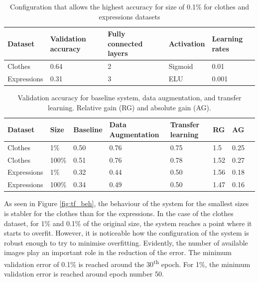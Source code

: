 \documentclass{article}
\begin{document}
\begin{table}[!htb]
  \vskip 5mm
  \centering
  \begin{tabular}{| l | l | l | l | l |}
    \hline
    \textbf{Dataset} & \textbf{Validation accuracy} & \textbf{Fully connected layers}& \textbf{Activation} & \textbf{Learning rates}\\ \hline
    Clothes & 0.64 & 2 & Sigmoid & 0.01 \\ \hline
    Expressions & 0.31  & 3 & ELU & 0.001 \\ \hline
  \end{tabular}
  \caption{Configuration that allows the highest accuracy for size of 0.1\% for clothes and expressions datasets}
  \label{tab:tf_1}
\end{table}

\begin{table}[!htb]
  \centering
  \begin{tabular}{| l | l | l | l | l | l | l | l |}
    \hline
    \textbf{Dataset} & \textbf{Size} & \textbf{Baseline} & \textbf{Data Augmentation}& \textbf{Transfer learning} & \textbf{RG} &\textbf{AG}\\ \hline
    Clothes & 1\% & 0.50 & 0.76 & 0.75 & 1.5 & 0.25\\ \hline
    Clothes & 100\% & 0.51 & 0.76 & 0.78 & 1.52 & 0.27\\ \hline
    Expressions & 1\% & 0.32  & 0.44 & 0.50 & 1.56 & 0.18\\ \hline
    Expressions & 100\% & 0.34  & 0.49 & 0.50 & 1.47 & 0.16\\ \hline
  \end{tabular}
  \caption{Validation accuracy for baseline system, data augmentation, and transfer learning. Relative gain (RG) and absolute gain (AG).}
  \label{tab:tf_2}
\end{table}

As seen in Figure \ref{fig:tf_beh}, the behaviour of the system for the smallest sizes is stabler for the clothes than for the expressions. In the case of the clothes dataset, for 1\% and 0.1\% of the original size, the system reaches a point where it starts to overfit. However, it is noticeable how the configuration of the system is robust enough to try to minimise overfitting. Evidently, the number of available images play an important role in the reduction of the error. The minimum validation error of 0.1\% is reached around the 30\textsuperscript{th} epoch. For 1\%, the minimum validation error is reached around epoch number 50.
\end{document}
